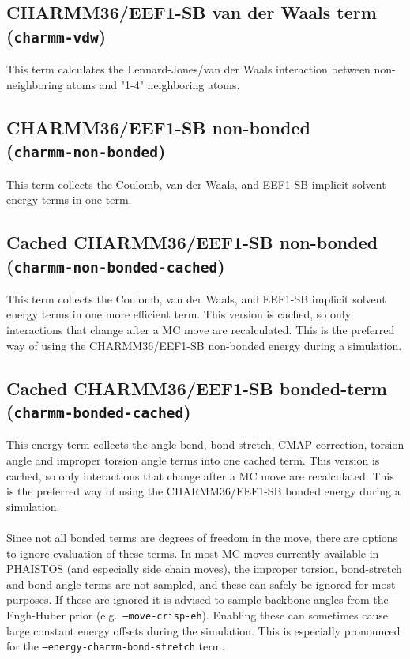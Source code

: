 \subsection{CHARMM36/EEF1-SB van der Waals term\\(\texttt{charmm-vdw})}
This term calculates the Lennard-Jones/van der Waals interaction between non-neighboring atoms and "1-4" neighboring atoms. 


\subsection{CHARMM36/EEF1-SB non-bonded\\(\texttt{charmm-non-bonded})}
This term collects the Coulomb, van der Waals, and EEF1-SB implicit solvent energy terms in one term.

\subsection{Cached CHARMM36/EEF1-SB non-bonded\\(\texttt{charmm-non-bonded-cached})}
This term collects the Coulomb, van der Waals, and EEF1-SB implicit solvent energy terms in one more efficient term.
This version is cached, so only interactions that change after a MC move are recalculated.
This is the preferred way of using the CHARMM36/EEF1-SB non-bonded energy during a simulation.

\subsection{Cached CHARMM36/EEF1-SB bonded-term\\(\texttt{charmm-bonded-cached})}

This energy term collects the angle bend, bond stretch, CMAP correction, torsion angle and improper torsion angle terms into one cached term.
This version is cached, so only interactions that change after a MC move are recalculated.
This is the preferred way of using the CHARMM36/EEF1-SB bonded energy during a simulation.
\\\\Since not all bonded terms are degrees of freedom in the move, there are options to ignore evaluation of these terms.
In most MC moves currently available in PHAISTOS (and especially side chain moves), the improper torsion, bond-stretch and bond-angle terms are not sampled, and these can safely be ignored for most purposes.
If these are ignored it is advised to sample backbone angles from the Engh-Huber prior (e.g.~\texttt{--move-crisp-eh}).
Enabling these can sometimes cause large constant energy offsets during the simulation.
This is especially pronounced for the \texttt{--energy-charmm-bond-stretch} term.

